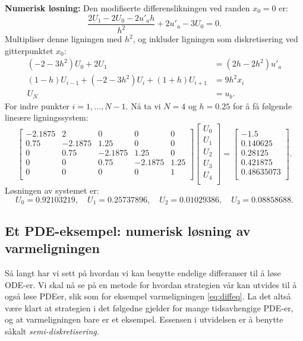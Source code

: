 \textbf{Numerisk løsning: }Den modifiserte differenslikningen ved randen \( x_0 = 0 \) er:
\[
\frac{2U_1 - 2U_0 - 2u'_a h}{h^2} + 2u'_a - 3U_0 = 0.
\]
Multipliser denne ligningen med \( h^2 \), og inkluder ligningen som diskretisering ved gitterpunktet \( x_0 \):
\begin{align*}
(-2 - 3h^2)U_0 + 2U_1 &= (2h - 2h^2)u'_a \\ 
(1 - h)U_{i-1} + (-2 - 3h^2)U_i + (1 + h)U_{i+1} &= 9h^2 x_i\\
U_N &= u_b.
\end{align*}
For indre punkter \( i = 1, \dots, N-1 \). Nå ta vi \( N = 4 \) og \( h = 0.25 \) for å få følgende lineære ligningssystem:
\[
\begin{bmatrix}
-2.1875 & 2       & 0       & 0       & 0 \\
0.75    & -2.1875 & 1.25    & 0       & 0 \\
0       & 0.75    & -2.1875 & 1.25    & 0 \\
0       & 0       & 0.75    & -2.1875 & 1.25 \\
0       & 0       & 0       & 0       & 1 \\
\end{bmatrix}
\begin{bmatrix}
U_0 \\
U_1 \\
U_2 \\
U_3 \\
U_4 \\
\end{bmatrix}
=
\begin{bmatrix}
-1.5 \\
0.140625 \\
0.28125 \\
0.421875 \\
0.48635073 \\
\end{bmatrix}.
\]
Løsningen av systemet er:
\[
U_0 = 0.92103219, \quad U_1 = 0.25737896, \quad U_2 = 0.01029386, \quad U_3 = 0.08858688.
\]

\subsection{Et PDE-eksempel: numerisk løsning av varmeligningen}

Så langt har vi sett på hvordan vi kan benytte endelige differanser til å løse ODE-er. Vi skal nå se på en metode for hvordan strategien vår kan utvides til å også løse PDEer, slik som for eksempel varmeligningen \eqref{eq:diffeq}. La det altså være klart at strategien i det følgedne gjelder for mange tidsavhengige PDE-er, og at varmeligningen bare er et eksempel. Essensen i utvidelsen er å benytte såkalt \textit{semi-diskretisering.}

